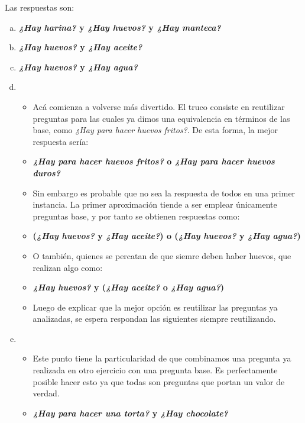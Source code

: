 \begin{solution}
    Las respuestas son:

    \begin{enumerate}[a)]
        \item \textbf{\textit{¿Hay harina?} y \textit{¿Hay huevos?} y \textit{¿Hay
        manteca?}}

        \item \textbf{\textit{¿Hay huevos?} y \textit{¿Hay aceite?}}

        \item \textbf{\textit{¿Hay huevos?} y \textit{¿Hay agua?}}

        \item
            \begin{itemize}[label=, leftmargin=0mm,itemsep=8pt]
                \item  Acá comienza a volverse más divertido. El truco consiste en
                reutilizar preguntas para las cuales ya dimos una equivalencia en
                términos de las base, como \textit{¿Hay para hacer huevos fritos?}.
                De esta forma, la mejor respuesta sería:
                \item \textbf{\textit{¿Hay para hacer huevos fritos?} o \textit{¿Hay
                para hacer huevos duros?}}
                \item Sin embargo es probable que no sea la respuesta de todos en
                una primer instancia. La primer aproximación tiende a ser emplear
                únicamente preguntas base, y por tanto se obtienen respuestas como:
                \item \textbf{(\textit{¿Hay huevos?} y \textit{¿Hay aceite?}) o
                (\textit{¿Hay huevos?} y \textit{¿Hay agua?})}
                \item O también, quienes se percatan de que siemre deben haber
                huevos, que realizan algo como:
                \item \textbf{\textit{¿Hay huevos?} y (\textit{¿Hay aceite?} o
                \textit{¿Hay agua?})}
                \item Luego de explicar que la mejor opción es reutilizar las
                preguntas ya analizadas, se espera respondan las siguientes siempre
                reutilizando.
            \end{itemize}

        \item
            \begin{itemize}[label=, leftmargin=0mm,itemsep=8pt]
                \item Este punto tiene la particularidad de que combinamos una
                pregunta ya realizada en otro ejercicio con una pregunta base. Es
                perfectamente posible hacer esto ya que todas son preguntas que
                portan un valor de verdad.
                \item \textbf{\textit{¿Hay para hacer una torta?} y \textit{¿Hay
                chocolate?}}
            \end{itemize}


\end{enumerate}
\end{solution}
